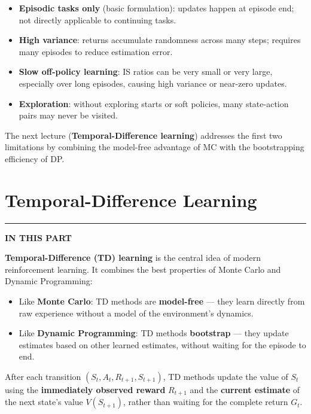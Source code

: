 \documentclass[11pt,a4paper]{article}
\theoremstyle{definition}
\theoremstyle{plain}
\theoremstyle{remark}
\newcommand{\partmtoc}{%
  \vspace{2pt}%
  {\color{rlrule}\rule{\linewidth}{0.5pt}}\par\vspace{3pt}%
  {\footnotesize\bfseries\color{rlaccent}IN THIS PART}\par\vspace{2pt}%
  \begingroup
  \etocsetnexttocdepth{subsection}%
  \localtableofcontents
  \endgroup
  \vspace{2pt}{\color{rlrule}\rule{\linewidth}{0.5pt}}\par\vspace{10pt}}
\begin{document}
\begin{tcolorbox}[colback=yellow!10!white, colframe=orange!80!black, title={Limitations of Monte Carlo Methods}]
\begin{itemize}
    \item \textbf{Episodic tasks only} (basic formulation): updates happen at episode end; not directly applicable to continuing tasks.
    \item \textbf{High variance}: returns accumulate randomness across many steps; requires many episodes to reduce estimation error.
    \item \textbf{Slow off-policy learning}: IS ratios can be very small or very large, especially over long episodes, causing high variance or near-zero updates.
    \item \textbf{Exploration}: without exploring starts or soft policies, many state-action pairs may never be visited.
\end{itemize}
The next lecture (\textbf{Temporal-Difference learning}) addresses the first two limitations by combining the model-free advantage of MC with the bootstrapping efficiency of DP.
\end{tcolorbox}


\part{Temporal-Difference Learning}
\partmtoc

\textbf{Temporal-Difference (TD) learning} is the central idea of modern reinforcement learning. It combines the best properties of Monte Carlo and Dynamic Programming:

\begin{itemize}
    \item Like \textbf{Monte Carlo}: TD methods are \textbf{model-free} — they learn directly from raw experience without a model of the environment's dynamics.
    \item Like \textbf{Dynamic Programming}: TD methods \textbf{bootstrap} — they update estimates based on other learned estimates, without waiting for the episode to end.
\end{itemize}

\begin{tcolorbox}[colback=blue!5!white, colframe=blue!60!black, title={The Central Idea of TD Learning}]
After each transition $(S_t, A_t, R_{t+1}, S_{t+1})$, TD methods update the value of $S_t$ using the \textbf{immediately observed reward} $R_{t+1}$ and the \textbf{current estimate} of the next state's value $V(S_{t+1})$, rather than waiting for the complete return $G_t$.
\end{tcolorbox}
\end{document}

